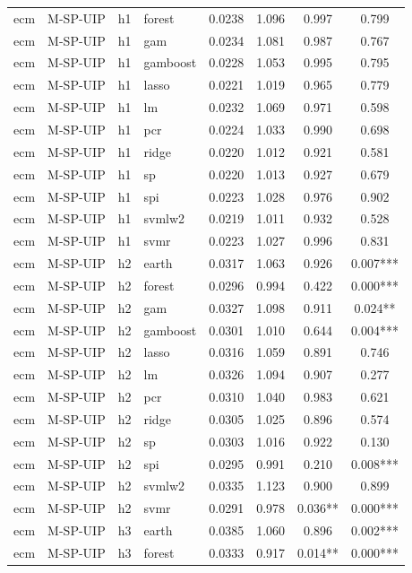 \begin{ThreePartTable}
\begin{longtable}[t]{llclcccc}
ecm & M-SP-UIP & h1 & forest & 0.0238 & 1.096 & 0.997 & 0.799\\
ecm & M-SP-UIP & h1 & gam & 0.0234 & 1.081 & 0.987 & 0.767\\
ecm & M-SP-UIP & h1 & gamboost & 0.0228 & 1.053 & 0.995 & 0.795\\
ecm & M-SP-UIP & h1 & lasso & 0.0221 & 1.019 & 0.965 & 0.779\\
ecm & M-SP-UIP & h1 & lm & 0.0232 & 1.069 & 0.971 & 0.598\\
ecm & M-SP-UIP & h1 & pcr & 0.0224 & 1.033 & 0.990 & 0.698\\
ecm & M-SP-UIP & h1 & ridge & 0.0220 & 1.012 & 0.921 & 0.581\\
ecm & M-SP-UIP & h1 & sp & 0.0220 & 1.013 & 0.927 & 0.679\\
ecm & M-SP-UIP & h1 & spi & 0.0223 & 1.028 & 0.976 & 0.902\\
ecm & M-SP-UIP & h1 & svmlw2 & 0.0219 & 1.011 & 0.932 & 0.528\\
ecm & M-SP-UIP & h1 & svmr & 0.0223 & 1.027 & 0.996 & 0.831\\
\addlinespace
ecm & M-SP-UIP & h2 & earth & 0.0317 & 1.063 & 0.926 & 0.007***\\
ecm & M-SP-UIP & h2 & forest & 0.0296 & 0.994 & 0.422 & 0.000***\\
ecm & M-SP-UIP & h2 & gam & 0.0327 & 1.098 & 0.911 & 0.024**\\
ecm & M-SP-UIP & h2 & gamboost & 0.0301 & 1.010 & 0.644 & 0.004***\\
ecm & M-SP-UIP & h2 & lasso & 0.0316 & 1.059 & 0.891 & 0.746\\
ecm & M-SP-UIP & h2 & lm & 0.0326 & 1.094 & 0.907 & 0.277\\
ecm & M-SP-UIP & h2 & pcr & 0.0310 & 1.040 & 0.983 & 0.621\\
ecm & M-SP-UIP & h2 & ridge & 0.0305 & 1.025 & 0.896 & 0.574\\
ecm & M-SP-UIP & h2 & sp & 0.0303 & 1.016 & 0.922 & 0.130\\
ecm & M-SP-UIP & h2 & spi & 0.0295 & 0.991 & 0.210 & 0.008***\\
ecm & M-SP-UIP & h2 & svmlw2 & 0.0335 & 1.123 & 0.900 & 0.899\\
ecm & M-SP-UIP & h2 & svmr & 0.0291 & 0.978 & 0.036** & 0.000***\\
\addlinespace
ecm & M-SP-UIP & h3 & earth & 0.0385 & 1.060 & 0.896 & 0.002***\\
ecm & M-SP-UIP & h3 & forest & 0.0333 & 0.917 & 0.014** & 0.000***\\

\end{longtable}
\end{ThreePartTable}
